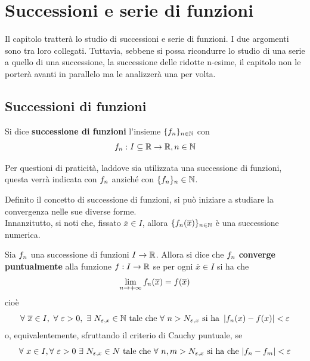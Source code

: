 \chapter{Successioni e serie di funzioni}
Il capitolo tratterà lo studio di successioni e serie di funzioni. I due argomenti sono tra loro collegati. Tuttavia, sebbene si possa ricondurre lo studio di una serie a quello di una successione, la successione delle ridotte n-esime, il capitolo non le porterà avanti in parallelo ma le analizzerà una per volta.
\section{Successioni di funzioni}
\begin{definition} \label{Def: Successione di funzioni}
     Si dice \textbf{successione di funzioni} l'insieme $\{f_n\}_{n \in \mathbb{N}}$ con
     \begin{equation}
         f_n: I \subseteq \mathbb{R} \to \mathbb{R}, n \in \mathbb{N}
     \end{equation}
\end{definition}
\begin{oss}
    Per questioni di praticità, laddove sia utilizzata una successione di funzioni, questa verrà indicata con $f_n$ anziché con $\{f_n\}_n\in \mathbb{N}$.
\end{oss}
Definito il concetto di successione di funzioni, si può iniziare a studiare la convergenza nelle sue diverse forme.\\
Innanzitutto, si noti che, fissato $\overline{x}\in I$, 
allora $\{f_n(\overline{x})\}_{n \in \mathbb{N}}$ è una successione numerica.
\begin{definition} \label{Def: Convergenza puntuale succ}
    Sia $f_n$ una successione di funzioni $I\to \mathbb{R}$. Allora si dice che $f_n$ \textbf{converge puntualmente} alla funzione $f: I \to \mathbb{R}$ se per ogni $\overline{x} \in I$ si ha che
    \begin{equation}
        \lim_{n \to +\infty} f_n(\overline{x}) = f(\overline{x})
    \end{equation}
    cioè
    \begin{equation}
        \forall\ \overline{x} \in I,\ \forall\ \varepsilon > 0,\ \exists\ N_{\varepsilon, x} \in \N\ \text{tale che}\ \forall\ n> N_{\varepsilon,x}\ \text{si ha}\ \left| \fn(x)-f(x)\right| < \varepsilon
    \end{equation}
    o, equivalentemente, sfruttando il criterio di Cauchy puntuale, se
\begin{equation}
    \forall\ x \in I, \forall\ \varepsilon > 0\ \exists\ N_{\varepsilon, x} \in N\ \text{tale che}\ \forall\ n,m > N_{\varepsilon, x}\ \text{si ha che}\ |\fn - f_m|<\varepsilon
\end{equation}
\end{definition}    
